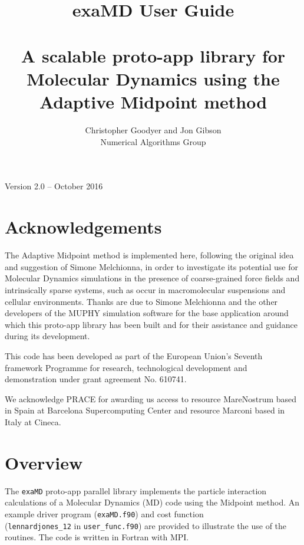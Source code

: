 \documentclass[paper=a4, fontsize=11pt,bibtotoc]{scrartcl}		%
\title{ 	%
		 	~\mbox{ }\\[1.0cm]									%
			\HRule{2pt} \\										%
			\Huge \textbf{exa\uppercase{MD} User Guide}\\	%
		 	~\mbox{ }\\[0.5cm]									%
			\Large \textbf{A scalable proto-app library for Molecular Dynamics using the Adaptive Midpoint method} %
			\HRule{2pt} \\ [0.5cm]									%
			\normalsize %
		}
\author{
		Christopher Goodyer and Jon Gibson\\	
		Numerical Algorithms Group\\
}
\makeatletter
\def\printtitle{%
    {\centering \@title\par}}
\def\printauthor{%
    {\centering \large \@author}}
\newcommand{\TT}[1]{\texttt{#1}}
\makeatother
\begin{document}
\thispagestyle{empty}				%

\printtitle					%
  	\vfill
\printauthor					%
  	\vfill
\centerline{Version 2.0 -- October 2016}

\newpage

\tableofcontents

\section*{Acknowledgements}

The Adaptive Midpoint method is implemented here, following the original idea and suggestion of Simone Melchionna, 
in order to investigate its potential use for Molecular Dynamics simulations
in the presence of coarse-grained force fields and intrinsically sparse systems, such as occur in macromolecular suspensions
and cellular environments.
Thanks are due to Simone Melchionna and the other developers of the MUPHY simulation software for the base application around which 
this proto-app library has been built and for their assistance and guidance during its development.

\noindent
This code has been developed as part of the European Union's Seventh framework
Programme for research, technological development and demonstration under grant agreement No. 610741.

\noindent
We acknowledge PRACE for awarding us access to resource MareNostrum based in Spain at Barcelona Supercomputing Center and resource Marconi 
based in Italy at Cineca.

\clearpage


\section{Overview}

The \TT{exaMD} proto-app parallel library implements the particle interaction calculations of a Molecular Dynamics (MD) code using the Midpoint 
method. An example driver program (\TT{exaMD.f90}) and cost function\\ 
(\TT{lennardjones\_12} in \TT{user\_func.f90}) 
are provided to illustrate the use of the routines. The code is written in Fortran with MPI. 
\end{document}
